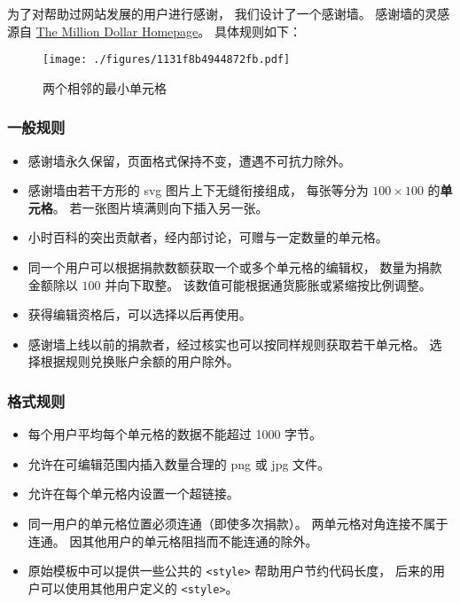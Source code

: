 
\begin{issues}
\issueDraft
{}
\end{issues}

为了对帮助过网站发展的用户进行感谢， 我们设计了一个感谢墙。 感谢墙的灵感源自 \href{https://en.wikipedia.org/wiki/The_Million_Dollar_Homepage}{The Million Dollar Homepage}。 具体规则如下：

\begin{figure}[ht]
\centering
\texttt{[image: ./figures/1131f8b4944872fb.pdf]}
\caption{两个相邻的最小单元格} \label{fig_thanks_1}
\end{figure}

\subsubsection{一般规则}
\begin{itemize}
\item 感谢墙永久保留，页面格式保持不变，遭遇不可抗力除外。
\item 感谢墙由若干方形的 svg 图片上下无缝衔接组成， 每张等分为 $100\times 100$ 的\textbf{单元格}。 若一张图片填满则向下插入另一张。
\item 小时百科的突出贡献者，经内部讨论，可赠与一定数量的单元格。
\item 同一个用户可以根据捐款数额获取一个或多个单元格的编辑权， 数量为捐款金额除以 $100$ 并向下取整。 该数值可能根据通货膨胀或紧缩按比例调整。
\item 获得编辑资格后，可以选择以后再使用。
\item 感谢墙上线以前的捐款者，经过核实也可以按同样规则获取若干单元格。 选择根据规则兑换账户余额的用户除外。
\end{itemize}

\subsubsection{格式规则}
\begin{itemize}
\item 每个用户平均每个单元格的数据不能超过 1000 字节。
\item 允许在可编辑范围内插入数量合理的 png 或 jpg 文件。
\item 允许在每个单元格内设置一个超链接。
\item 同一用户的单元格位置必须连通（即使多次捐款）。 两单元格对角连接不属于连通。 因其他用户的单元格阻挡而不能连通的除外。
\item 原始模板中可以提供一些公共的 \verb`<style>` 帮助用户节约代码长度， 后来的用户可以使用其他用户定义的 \verb`<style>`。
\end{itemize}

